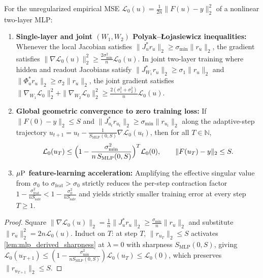 \begin{lemma}\label{lem:joint_pl_convergence}
\leanok
{}
For the unregularized empirical MSE $\mathcal{L}_0(u) = \frac{1}{2n}\|F(u)-y\|_2^2$ of a nonlinear two-layer MLP:
\begin{enumerate}
\item \textbf{Single-layer and joint $(W_1, W_2)$ Polyak--{\L}ojasiewicz inequalities:} Whenever the local Jacobian satisfies $\|J_u^* r_u\|_2 \ge \sigma_{\min}\|r_u\|_2$, the gradient satisfies $\|\nabla\mathcal{L}_0(u)\|_2^2 \ge \frac{2\sigma_{\min}^2}{n}\mathcal{L}_0(u)$. In joint two-layer training where hidden and readout Jacobians satisfy $\|J_{W_1}^* r_u\|_2 \ge \sigma_1\|r_u\|_2$ and $\|\Phi_u^* r_u\|_2 \ge \sigma_2\|r_u\|_2$, the joint gradient satisfies $\|\nabla_{W_1}\mathcal{L}_0\|_2^2 + \|\nabla_{W_2}\mathcal{L}_0\|_2^2 \ge \frac{2(\sigma_1^2 + \sigma_2^2)}{n}\mathcal{L}_0(u)$.
\item \textbf{Global geometric convergence to zero training loss:} If $\|F(0)-y\|_2\le S$ and $\|J_{u_t}^* r_{u_t}\|_2 \ge \sigma_{\min}\|r_{u_t}\|_2$ along the adaptive-step trajectory $u_{t+1} = u_t - \frac{1}{S_{\mathrm{MLP}}(0,S)}\nabla\mathcal{L}_0(u_t)$, then for all $T\in\mathbb{N}$,
\[
\mathcal{L}_0(u_T) \le \Bigl(1 - \frac{\sigma_{\min}^2}{n\,S_{\mathrm{MLP}}(0,S)}\Bigr)^T \mathcal{L}_0(0),\qquad \|F(u_T)-y\|_2 \le S.
\]
\item \textbf{$\mu\mathrm{P}$ feature-learning acceleration:} Amplifying the effective singular value from $\sigma_0$ to $\sigma_{\mathrm{feat}} > \sigma_0$ strictly reduces the per-step contraction factor $1 - \frac{\sigma_{\mathrm{feat}}^2}{n S_{\mathrm{safe}}} < 1 - \frac{\sigma_0^2}{n S_{\mathrm{safe}}}$ and yields strictly smaller training error at every step $T\ge 1$.
\end{enumerate}
\end{lemma}
\begin{proof}
\leanok
Square $\|\nabla\mathcal{L}_0(u)\|_2 = \frac{1}{n}\|J_u^* r_u\|_2 \ge \frac{\sigma_{\min}}{n}\|r_u\|_2$ and substitute $\|r_u\|_2^2 = 2n\mathcal{L}_0(u)$. Induct on $T$: at step $T$, $\|r_{u_T}\|_2\le S$ activates \cref{lem:mlp_derived_sharpness} at $\lambda=0$ with sharpness $S_{\mathrm{MLP}}(0,S)$, giving $\mathcal{L}_0(u_{T+1}) \le (1 - \frac{\sigma_{\min}^2}{n S_{\mathrm{MLP}}(0,S)})\mathcal{L}_0(u_T) \le \mathcal{L}_0(0)$, which preserves $\|r_{u_{T+1}}\|_2\le S$.
\end{proof}

